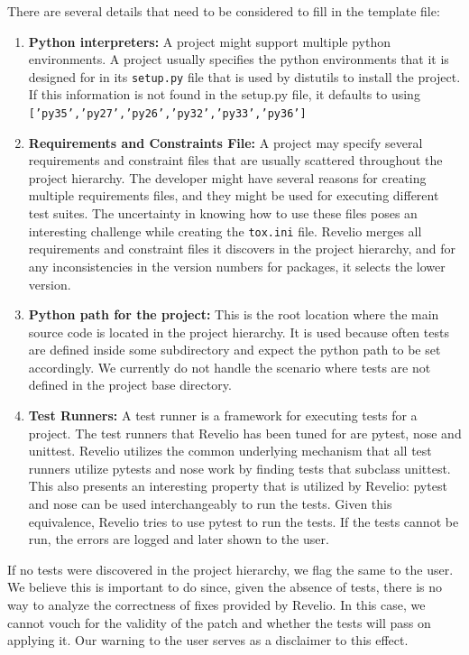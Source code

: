 There are several details that need to be considered to fill in the template file:
\begin{enumerate}
    \item \textbf{Python interpreters:} A project might support multiple python environments. A project usually specifies the python environments that it is designed for in its \texttt{setup.py} file that is used by distutils to install the project. If this information is not found in the setup.py file, it defaults to using \texttt{['py35','py27','py26','py32','py33','py36']}
    \item \textbf{Requirements and Constraints File:}  A project may specify several requirements and constraint files that are usually scattered throughout the project hierarchy. The developer might have several reasons for creating multiple requirements files, and they might be used for executing different test suites. The uncertainty in knowing how to use these files poses an interesting challenge while creating the \texttt{tox.ini} file. Revelio merges all requirements and constraint files it discovers in the project hierarchy, and for any inconsistencies in the version numbers for packages, it selects the lower version.
    \item \textbf{Python path for the project:} This is the root location where the main source code is located in the project hierarchy. It is used because often tests are defined inside some subdirectory and expect the python path to be set accordingly. We currently do not handle the scenario where tests are not defined in the project base directory.
    \item \textbf{Test Runners:} A test runner is a framework for executing tests for a project. The test runners that Revelio has been tuned for are pytest, nose and unittest. Revelio utilizes the common underlying mechanism that all test runners utilize pytests and nose work by finding tests that subclass unittest. This also presents an interesting property that is utilized by Revelio: pytest and nose can be used interchangeably to run the tests. Given this equivalence, Revelio tries to use pytest to run the tests. If the tests cannot be run, the errors are logged and later shown to the user.  
\end{enumerate}

If no tests were discovered in the project hierarchy, we flag the same to the user. We believe this is important to do since, given the absence of tests, there is no way to analyze the correctness of fixes provided by Revelio. In this case, we cannot vouch for the validity of the patch and whether the tests will pass on applying it. Our warning to the user serves as a disclaimer to this effect. 


